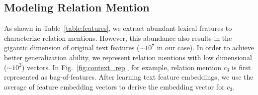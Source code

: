 






\subsection{Modeling Relation Mention }
As shown in Table~\ref{table:features}, we extract abundant lexical features \cite{ren2016cotype,mintz2009distant} to characterize relation mentions. 
However, this abundance also results in the gigantic dimension of original text features ($\sim10^7$ in our case). 
In order to achieve better generalization ability, we represent relation mentions with low dimensional ($\sim10^2$) vectors. 
In Fig.~\ref{fig:context_rep}, for example, relation mention $c_3$ is first represented as bag-of-features. 
After learning text feature embeddings, we use the average of feature embedding vectors to derive the embedding vector for $c_3$.


